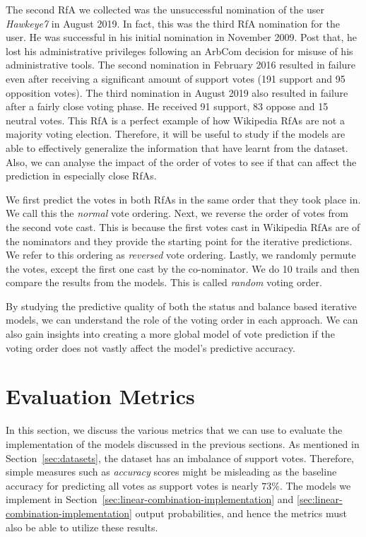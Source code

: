 The second RfA we collected was the unsuccessful nomination of the user \textit{Hawkeye7} in August 2019.
In fact, this was the third RfA nomination for the user.
He was successful in his initial nomination in November 2009.
Post that, he lost his administrative privileges following an ArbCom decision for misuse of his administrative tools.
The second nomination in February 2016 resulted in failure even after receiving a significant amount of support votes (191 support and 95 opposition votes).
The third nomination in August 2019 also resulted in failure after a fairly close voting phase.
He received 91 support, 83 oppose and 15 neutral votes.
This RfA is a perfect example of how Wikipedia RfAs are not a majority voting election.
Therefore, it will be useful to study if the models are able to effectively generalize the information that have learnt from the \wikirfa dataset.
Also, we can analyse the impact of the order of votes to see if that can affect the prediction in especially close RfAs.

We first predict the votes in both RfAs in the same order that they took place in.
We call this the \textit{normal} vote ordering.
Next, we reverse the order of votes from the second vote cast.
This is because the first votes cast in Wikipedia RfAs are of the nominators and they provide the starting point for the iterative predictions.
We refer to this ordering as \textit{reversed} vote ordering.
Lastly, we randomly permute the votes, except the first one cast by the co-nominator.
We do 10 trails and then compare the results from the models.
This is called \textit{random} voting order.

By studying the predictive quality of both the status and balance based iterative models, we can understand the role of the voting order in each approach.
We can also gain insights into creating a more global model of vote prediction if the voting order does not vastly affect the model's predictive accuracy.


\section{Evaluation Metrics}
\label{sec:eval-metrics}
In this section, we discuss the various metrics that we can use to evaluate the implementation of the models discussed in the previous sections.
As mentioned in Section~\ref{sec:datasets}, the \wikirfa dataset has an imbalance of support votes.
Therefore, simple measures such as \textit{accuracy} scores might be misleading as the baseline accuracy for predicting all votes as support votes is nearly $73\%$.
The models we implement in Section~\ref{sec:linear-combination-implementation} and \ref{sec:linear-combination-implementation} output probabilities, and hence the metrics must also be able to utilize these results.

